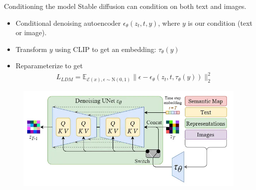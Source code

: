 \documentclass[8pt]{beamer}
\begin{document}
\begin{frame}{Conditioning the model}
    Stable diffusion can condition on both text and images.
    \begin{itemize}
        \item Conditional denoising autoencoder $\epsilon_{\theta}(z_t, t, y)$, where $y$ is our condition (text or image).
        \item Transform $y$ using CLIP to get an embedding: $\tau_{\theta}(y)$
        \item Reparameterize to get
        \begin{align*}
            L_{LDM} = \mathbb{E}_{\mathcal{E}(x), \epsilon \sim \text{N}(0,1)} \lVert \epsilon - \epsilon_{\theta}(z_t, t, \tau_{\theta}(y)) \rVert_2^2
        \end{align*}
    \end{itemize}
   \begin{figure}
       \centering
       \includegraphics[scale=.35]{images/unet_text_condition.png}
       \label{fig:NN_training}
   \end{figure}~\cite{steins}
\end{frame}
\end{document}
